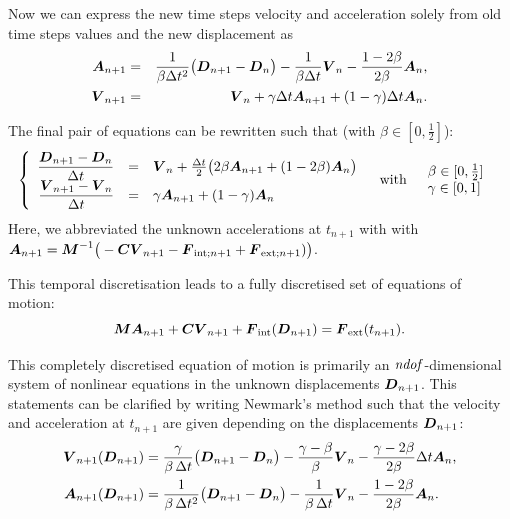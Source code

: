 Now we can express the new time steps velocity and acceleration solely from old time steps values and the new displacement as
\begin{eqnarray*}
  \boldsymbol{A}_{n+1}
  &=& \frac{1}{\beta\Delta t^2} \big( \boldsymbol{D}_{n+1} - \boldsymbol{D}_n \big)
  - \frac{1}{\beta \Delta t} \boldsymbol{V}_n
  - \frac{1-2\beta}{2\beta} \boldsymbol{A}_n\text{,}\\
    \boldsymbol{V}_{n+1}
  &=& \boldsymbol{V}_{n} + \gamma\Delta t \boldsymbol{A}_{n+1} + (1-\gamma)\Delta t\boldsymbol{A}_n\text{.}
\end{eqnarray*}

The final pair of equations can be rewritten such that (with $\beta\in[0,\frac{1}{2}]$):
\begin{equation}\label{eq:strdyn:newmark}
\begin{aligned}
& \left\{\begin{array}{rcl}
  \dfrac{\boldsymbol{D}_{n+1} - \boldsymbol{D}_n}{\Delta t}
  & =
  & \boldsymbol{V}_n + \frac{\Delta t}{2} \big(
    2\beta \boldsymbol{A}_{n+1} + (1-2\beta) \boldsymbol{A}_n
    \big)
\\
  \dfrac{\boldsymbol{V}_{n+1} - \boldsymbol{V}_n}{\Delta t}
  & =
  & \gamma \boldsymbol{A}_{n+1} + (1-\gamma)\boldsymbol{A}_n
\end{array}\right.
&& \text{with}
&&\begin{array}{l}
  \beta\in[0,\frac{1}{2}]
\\
  \gamma\in[0,1]
\end{array}
\end{aligned}
\end{equation}
Here, we abbreviated the unknown accelerations at $t_{n+1}$ with with
$\boldsymbol{A}_{n+1} = \boldsymbol{M}^{-1} \big( -\boldsymbol{C} \boldsymbol{V}_{n+1} -
\boldsymbol{F}_{\text{int};n+1} + \boldsymbol{F}_{\text{ext};n+1}) \big)$. 

This temporal discretisation leads to a
fully discretised set of equations of motion:
\begin{equation}
  \boldsymbol{M} \boldsymbol{A}_{n+1}
  + \boldsymbol{C} \boldsymbol{V}_{n+1}
  + \boldsymbol{F}_{\text{int}}(\boldsymbol{D}_{n+1})
  = \boldsymbol{F}_{\text{ext}}(t_{n+1})
  \text{.}
\end{equation}

This completely discretised equation of motion is primarily an
$\mathit{ndof}$-dimensional system of nonlinear equations in the unknown displacements
$\boldsymbol{D}_{n+1}$. This statements can be clarified by writing Newmark's method
such that the velocity and acceleration at $t_{n+1}$ are given depending on the
displacements $\boldsymbol{D}_{n+1}$:
\begin{align}\label{eq:newmark-velnew}
   \boldsymbol{V}_{n+1}(\boldsymbol{D}_{n+1})
&  = \frac{\gamma}{\beta\, \Delta t} \big( \boldsymbol{D}_{n+1} - \boldsymbol{D}_n \big)
   - \frac{\gamma-\beta}{\beta} \boldsymbol{V}_{n}
   - \frac{\gamma-2\beta}{2\beta}\Delta t \boldsymbol{A}_n
   \text{,}
\\ \label{eq:newmark-accnew}
   \boldsymbol{A}_{n+1}(\boldsymbol{D}_{n+1})
&  = \frac{1}{\beta\, \Delta t^2} \big( \boldsymbol{D}_{n+1} - \boldsymbol{D}_n \big)
   - \frac{1}{\beta\,\Delta t} \boldsymbol{V}_{n}
   - \frac{1-2\beta}{2\beta} \boldsymbol{A}_n
   \text{.}
\end{align}

